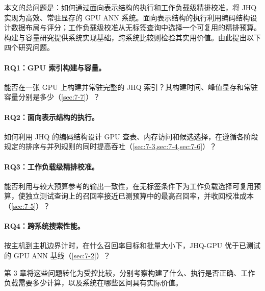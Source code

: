 本文的总问题是：如何通过面向表示结构的执行和工作负载级精排校准，将 JHQ 实现为高效、常驻显存的 GPU ANN 系统。面向表示结构的执行利用编码结构设计数据布局与评分；工作负载级校准从无标签查询中选择一个可复用的精排预算。构建与容量研究提供系统实现基础，跨系统比较则检验其实用价值。由此提出以下四个研究问题。

\paragraph{RQ1：GPU 索引构建与容量。}
能否在一张 GPU 上构建并常驻完整的 JHQ 索引？其构建时间、峰值显存和常驻容量分别是多少（\cref{sec:7-7}）？

\paragraph{RQ2：面向表示结构的执行。}
如何利用 JHQ 的编码结构设计 GPU 查表、内存访问和候选选择，在遵循各阶段规定的排序与并列规则的同时提高吞吐（\cref{sec:7-3,sec:7-4,sec:7-6}）？

\paragraph{RQ3：工作负载级精排校准。}
能否利用与较大预算参考的输出一致性，在无标签条件下为工作负载选择可复用预算，使独立测试查询上的召回率接近已测预算中的最高召回率，并收回校准成本（\cref{sec:7-5}）？

\paragraph{RQ4：跨系统搜索性能。}
按主机到主机边界计时，在什么召回率目标和批量大小下，JHQ-GPU 优于已测试的 GPU ANN 基线（\cref{sec:7-2}）？

第 3 章将这些问题转化为受控比较，分别考察构建了什么、执行是否正确、工作负载需要多少计算，以及系统在哪些区间具有实际价值。
